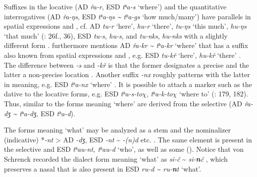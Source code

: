 Suffixes in the locative (AD \textit{řa-r}, ESD \textit{tʰ}\textit{a-s} ‘where’) and the quantitative interrogatives (AD \textit{řa-ŋs}, ESD \textit{tʰ}\textit{a-ŋs {\textasciitilde} t}\textit{ʰ}\textit{a-gs} ‘how much/many’) have parallels in spatial expressions and , cf. AD \textit{tu-r} ‘here’, \textit{hu-r} ‘there’, \textit{tu-ŋs} ‘this much’, \textit{hu-ŋs} ‘that much’ (\citealt{Gruzdeva1998}: 26f., 36), ESD \textit{tu-s}, \textit{hu-s}, and \textit{tu-nks}, \textit{hu-nks} with a slightly different form \citep[170]{Gruzdeva2008}. \citet[14]{Mattissen2003} furthermore mentions AD \textit{řa-kr {\textasciitilde} t}\textit{ʰ}\textit{a-kr} ‘where’ that has a suffix also known from spatial expressions and , e.g. ESD \textit{tu-kř} ‘here’, \textit{hu-kř} ‘there’ \citep[181]{Gruzdeva2008}. The difference between \textit{-s} and \textit{-kř} is that the former designates a precise and the latter a non-precise location \citep[178]{Gruzdeva2008}. Another suffix \textit{-nx} roughly patterns with the latter in meaning, e.g. ESD \textit{tʰ}\textit{a-nx} ‘where’ \citep[184]{Gruzdeva2008}. It is possible to attach a  marker such as the dative to the locative forms, e.g. ESD \textit{tʰ}\textit{a-s-to$\chi $}, \textit{tʰ}\textit{a-k-to$\chi $} ‘where to’ (\citealt{Gruzdeva2008}: 179, 182). Thus, similar to  the forms meaning ‘where’ are derived from the selective  (AD \textit{řa-dʒ {\textasciitilde} t}\textit{ʰ}\textit{a-dʒ}, ESD \textit{tʰ}\textit{a-d}).

The forms meaning ‘what’ may be analyzed as a stem and the nominalizer (indicative) *\textit{-nt} > AD \textit{-dʒ}, ESD \textit{-nt} {\textasciitilde} \textit{-(n)d} etc. \citep[1366]{Fortescue2011}. The same element is present in the selective  and ESD \textit{tʰ}\textit{au-nt, tʰ}\textit{au-d} ‘who’, as well as some  (). Notice that von Schrenck recorded the  dialect form meaning ‘what’ as \textit{si-č} {\textasciitilde} \textit{si-}\textbf{\textit{n}}\textit{č} \citep{Grube1892}, which preserves a nasal that is also present in ESD \textit{ru-d {\textasciitilde} ru-}\textbf{\textit{n}}\textit{t} ‘what’.

